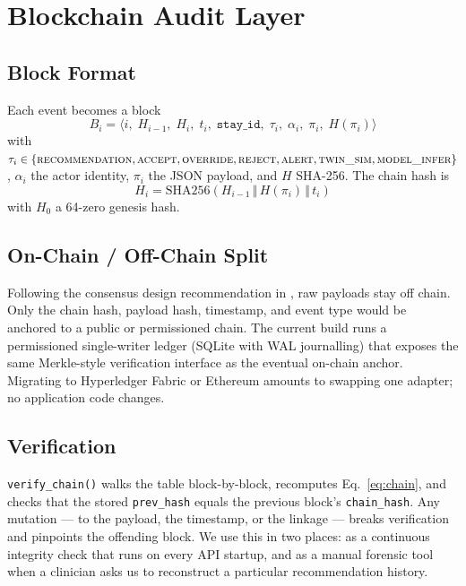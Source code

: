 \documentclass[conference]{IEEEtran}
\begin{document}
\section{Blockchain Audit Layer}
\label{sec:audit}

\subsection{Block Format}
Each event becomes a block
\[
  B_i = \langle i,\; H_{i-1},\; H_i,\; t_i,\; \texttt{stay\_id},\; \tau_i,\; \alpha_i,\; \pi_i,\; H(\pi_i)\rangle
\]
with $\tau_i \in \{\textsc{recommendation}, \textsc{accept}, \textsc{override}, \textsc{reject}, \textsc{alert}, \textsc{twin\_sim}, \textsc{model\_infer}\}$, $\alpha_i$ the actor identity, $\pi_i$ the JSON payload, and $H$ SHA-256. The chain hash is
\begin{equation}
  H_i = \mathrm{SHA256}\!\left(H_{i-1} \,\Vert\, H(\pi_i) \,\Vert\, t_i\right)
  \label{eq:chain}
\end{equation}
with $H_0$ a 64-zero genesis hash.

\subsection{On-Chain / Off-Chain Split}
Following the consensus design recommendation in \cite{onwubiko2023ethereum_ipfs,salahuddin2025bc_dt_review}, raw payloads stay off chain. Only the chain hash, payload hash, timestamp, and event type would be anchored to a public or permissioned chain. The current build runs a permissioned single-writer ledger (SQLite with WAL journalling) that exposes the same Merkle-style verification interface as the eventual on-chain anchor. Migrating to Hyperledger Fabric or Ethereum amounts to swapping one adapter; no application code changes.

\subsection{Verification}
\texttt{verify\_chain()} walks the table block-by-block, recomputes Eq.~\ref{eq:chain}, and checks that the stored \texttt{prev\_hash} equals the previous block's \texttt{chain\_hash}. Any mutation --- to the payload, the timestamp, or the linkage --- breaks verification and pinpoints the offending block. We use this in two places: as a continuous integrity check that runs on every API startup, and as a manual forensic tool when a clinician asks us to reconstruct a particular recommendation history.
\end{document}
